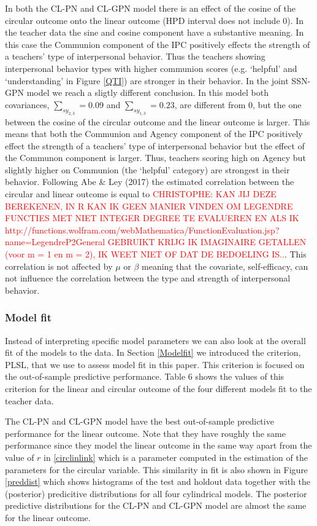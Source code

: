 \documentclass[11pt,]{article}
\begin{document}
In both the CL-PN and CL-GPN model there is an effect of the cosine of
the circular outcome onto the linear outcome (HPD interval does not
include 0). In the teacher data the sine and cosine component have a
substantive meaning. In this case the Communion component of the IPC
positively effects the strength of a teachers' type of interpersonal
behavior. Thus the teachers showing interpersonal behavior types with
higher communion scores (e.g. `helpful' and `understanding' in Figure
\ref{QTI}) are stronger in their behavior. In the joint SSN-GPN model we
reach a sligtly different conclusion. In this model both covariances,
\(\sum_{sy_{2,3}} = 0.09\) and \(\sum_{sy_{1,3}} = 0.23\), are different
from 0, but the one between the cosine of the circular outcome and the
linear outcome is larger. This means that both the Communion and Agency
component of the IPC positively effect the strength of a teachers' type
of interpersonal behavior but the effect of the Communon component is
larger. Thus, teachers scoring high on Agency but slightly higher on
Communion (the `helpful' category) are strongest in their behavior.
Following Abe \& Ley (2017) the estimated correlation between the
circular and linear outcome is equal to
\textcolor{red}{CHRISTOPHE: KAN JIJ DEZE BEREKENEN, IN R KAN IK GEEN MANIER
VINDEN OM LEGENDRE FUNCTIES MET NIET INTEGER DEGREE TE EVALUEREN EN ALS IK
http://functions.wolfram.com/webMathematica/FunctionEvaluation.jsp?name=LegendreP2General
GEBRUIKT KRIJG IK IMAGINAIRE GETALLEN (voor m = 1 en m = 2), IK WEET NIET OF DAT
DE BEDOELING IS..}. This correlation is not affected by \(\mu\) or
\(\beta\) meaning that the covariate, self-efficacy, can not influence
the correlation between the type and strength of interpersonal behavior.

\subsubsection{Model fit}

Instead of interpreting specific model parameters we can also look at
the overall fit of the models to the data. In Section \ref{Modelfit} we
introduced the criterion, PLSL, that we use to assess model fit in this
paper. This criterion is focused on the out-of-sample predictive
performance. Table 6 shows the values of this criterion for the linear
and circular outcome of the four different models fit to the teacher
data.

The CL-PN and CL-GPN model have the best out-of-sample predictive
performance for the linear outcome. Note that they have roughly the same
performance since they model the linear outcome in the same way apart
from the value of \(r\) in \eqref{circlinlink} which is a parameter
computed in the estimation of the parameters for the circular variable.
This similarity in fit is also shown in Figure \ref{preddist} which
shows histograms of the test and holdout data together with the
(posterior) predicitive distributions for all four cylindrical models.
The posterior predictive distributions for the CL-PN and CL-GPN model
are almost the same for the linear outcome.
\end{document}
